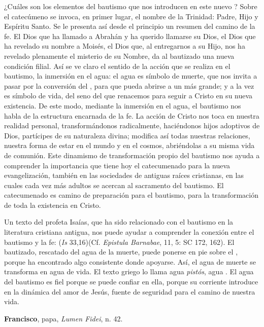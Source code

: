 \begin{patercite}
¿Cuáles son los elementos del bautismo que nos introducen en este nuevo ? Sobre el catecúmeno se invoca, en primer lugar, el nombre de la Trinidad: Padre, Hijo y Espíritu Santo. Se le presenta así desde el principio un resumen del camino de la fe. El Dios que ha llamado a Abrahán y ha querido llamarse su Dios, el Dios que ha revelado su nombre a Moisés, el Dios que, al entregarnos a su Hijo, nos ha revelado plenamente el misterio de su Nombre, da al bautizado una nueva condición filial. Así se ve claro el sentido de la acción que se realiza en el bautismo, la inmersión en el agua: el agua es símbolo de muerte, que nos invita a pasar por la conversión del , para que pueda abrirse a un  más grande; y a la vez es símbolo de vida, del seno del que renacemos para seguir a Cristo en su nueva existencia. De este modo, mediante la inmersión en el agua, el bautismo nos habla de la estructura encarnada de la fe. La acción de Cristo nos toca en nuestra realidad personal, transformándonos radicalmente, haciéndonos hijos adoptivos de Dios, partícipes de su naturaleza divina; modifica así todas nuestras relaciones, nuestra forma de estar en el mundo y en el cosmos, abriéndolas a su misma vida de comunión. Este dinamismo de transformación propio del bautismo nos ayuda a comprender la importancia que tiene hoy el catecumenado para la nueva evangelización, también en las sociedades de antiguas raíces cristianas, en las cuales cada vez más adultos se acercan al sacramento del bautismo. El catecumenado es camino de preparación para el bautismo, para la transformación de toda la existencia en Cristo. 
	
Un texto del profeta Isaías, que ha sido relacionado con el bautismo en la literatura cristiana antigua, nos puede ayudar a comprender la conexión entre el bautismo y la fe:  (\textit{Is} 33,16)(Cf. \textit{Epistula Barnabae}, 11, 5: SC 172, 162). El bautizado, rescatado del agua de la muerte, puede ponerse en pie sobre el , porque ha encontrado algo consistente donde apoyarse. Así, el agua de muerte se transforma en agua de vida. El texto griego lo llama agua \textit{pistós}, agua . El agua del bautismo es fiel porque se puede confiar en ella, porque su corriente introduce en la dinámica del amor de Jesús, fuente de seguridad para el camino de nuestra vida.
	
	\textbf{Francisco}, papa, \textit{Lumen Fidei}, n. 42.
\end{patercite}

